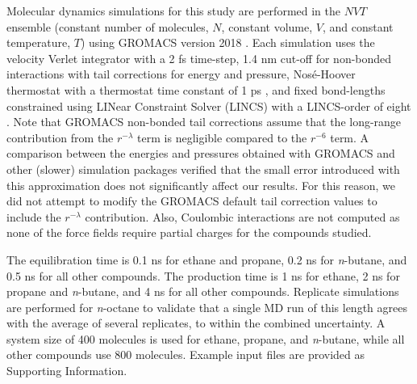 \documentclass[preprint,letterpaper,floatfix,citeautoscript,aip,jcp]{revtex4-1}
\begin{document}
Molecular dynamics simulations for this study are performed in the $NVT$ ensemble (constant number of molecules, $N$, constant volume, $V$, and constant temperature, $T$) using GROMACS version 2018 \cite{GROMACS_2018}. Each simulation uses the velocity Verlet integrator with a 2 fs time-step, 1.4 nm cut-off 
for non-bonded interactions with tail corrections for energy and pressure, Nos{\'e}-Hoover thermostat with a thermostat time constant of 1 ps \cite{Hoover1985}, and fixed bond-lengths 
constrained using LINear Constraint Solver (LINCS) with a LINCS-order of eight \cite{Hess1998,Hess2008}. Note that GROMACS non-bonded tail corrections assume that the long-range contribution from the $r^{-\lambda}$ term is negligible compared to the $r^{-6}$ term. A comparison between the energies and pressures obtained with GROMACS and other (slower) simulation packages verified that the small error introduced with this approximation does not significantly affect our results. For this reason, we did not attempt to modify the GROMACS default tail correction values to include the $r^{-\lambda}$ contribution. Also, Coulombic interactions are not computed as none of the force fields require partial charges for the compounds studied.

The equilibration time is 0.1 ns for ethane and propane, 0.2 ns for \textit{n}-butane, and 0.5 ns for all other compounds. The production time is 1 ns for ethane, 2 ns for propane and \textit{n}-butane, and 4 ns for all other compounds. Replicate simulations are performed for \textit{n}-octane to validate that a single MD run of this length agrees with the average of several replicates, to within the combined uncertainty. A system size of 400 molecules is used for ethane, propane, and \textit{n}-butane, while all other compounds use 800 molecules. 
Example input files are provided as Supporting Information.
\end{document}
